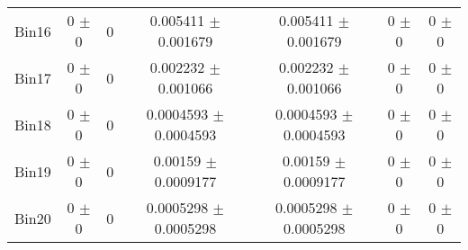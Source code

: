 \begin{tabular}{@{\extracolsep{4pt}}lcccccc@{}}
     Bin16 & 0 $\pm$ 0 & 0 & 0.005411 $\pm$ 0.001679 & 0.005411 $\pm$ 0.001679 & 0 $\pm$ 0 & 0 $\pm$ 0 \\ 
     Bin17 & 0 $\pm$ 0 & 0 & 0.002232 $\pm$ 0.001066 & 0.002232 $\pm$ 0.001066 & 0 $\pm$ 0 & 0 $\pm$ 0 \\ 
     Bin18 & 0 $\pm$ 0 & 0 & 0.0004593 $\pm$ 0.0004593 & 0.0004593 $\pm$ 0.0004593 & 0 $\pm$ 0 & 0 $\pm$ 0 \\ 
     Bin19 & 0 $\pm$ 0 & 0 & 0.00159 $\pm$ 0.0009177 & 0.00159 $\pm$ 0.0009177 & 0 $\pm$ 0 & 0 $\pm$ 0 \\ 
     Bin20 & 0 $\pm$ 0 & 0 & 0.0005298 $\pm$ 0.0005298 & 0.0005298 $\pm$ 0.0005298 & 0 $\pm$ 0 & 0 $\pm$ 0 \\ 
\hline\hline
  \end{tabular}
